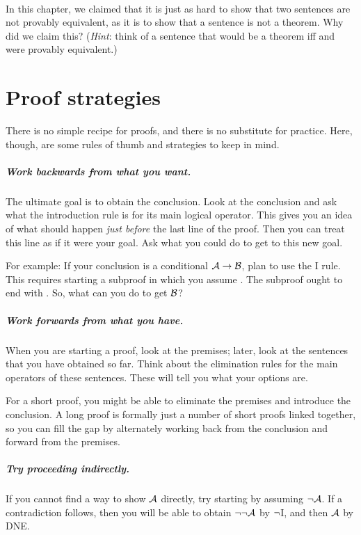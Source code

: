 \

\problempart In this chapter, we claimed that it is just as hard to show that two sentences are not provably equivalent, as it is to show that a sentence is not a theorem. Why did we claim this? (\emph{Hint}: think of a sentence that would be a theorem iff  and  were provably equivalent.)





\chapter{Proof strategies}
There is no simple recipe for proofs, and there is no substitute for practice. Here, though, are some rules of thumb and strategies to keep in mind.

\paragraph{Work backwards from what you want.}
The ultimate goal is to obtain the conclusion. Look at the conclusion and ask what the introduction rule is for its main logical operator. This gives you an idea of what should happen \emph{just before} the last line of the proof. Then you can treat this line as if it were your goal. Ask what you could do to get to this new goal.

For example: If your conclusion is a conditional $\mathcal{A}\rightarrow\mathcal{B}$, plan to use the {\eif}I rule. This requires starting a subproof in which you assume . The subproof ought to end with . So, what can you do to get $\mathcal{B}$?

\paragraph{Work forwards from what you have.}
When you are starting a proof, look at the premises; later, look at the sentences that you have obtained so far. Think about the elimination rules for the main operators of these sentences. These will tell you what your options are.

For a short proof, you might be able to eliminate the premises and introduce the conclusion. A long proof is formally just a number of short proofs linked together, so you can fill the gap by alternately working back from the conclusion and forward from the premises.

\paragraph{Try proceeding indirectly.}
If you cannot find a way to show $\mathcal{A}$ directly, try starting by assuming $\neg \mathcal{A}$. If a contradiction follows, then you will be able to obtain $\neg \neg \mathcal{A}$ by $\neg$I, and then $\mathcal{A}$ by DNE.  

